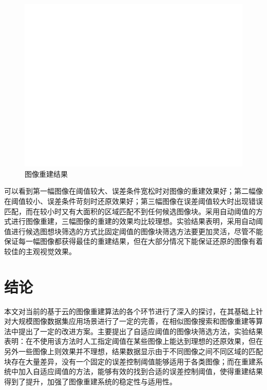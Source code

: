\documentclass[UTF8]{csoarticle}
\begin{document}
\begin{figure}
\centering\includegraphics[width=15cm]{rec_result}
\caption{图像重建结果}
\label{fig:result}
\end{figure}

可以看到第一幅图像在阈值较大、误差条件宽松时对图像的重建效果好；第二幅像在阈值较小、误差条件苛刻时还原效果好；第三幅图像在误差阈值较大时出现错误匹配，而在较小时又有大面积的区域匹配不到任何候选图像块。采用自动阈值的方式进行图像重建，三幅图像的重建的效果均比较理想。实验结果表明，采用自动阈值进行候选图想块筛选的方式比固定阈值的图像块筛选方法要更加灵活，尽管不能保证每一幅图像都获得最佳的重建结果，但在大部分情况下能保证还原的图像有着较佳的主观视觉效果。

\section{结论}

本文对当前的基于云的图像重建算法的各个环节进行了深入的探讨，在其基础上针对大规模图像数据集应用场景进行了一定的完善，在相似图像搜索和图像重建等算法中提出了一定的改进方案。主要提出了自适应阈值的图像块筛选方法，实验结果表明：在不使用该方法时人工指定阈值在某些图像上能达到理想的还原效果，但在另外一些图像上则效果并不理想，结果数据显示由于不同图像之间不同区域的匹配块存在大量差异，没有一个固定的误差控制阈值能够适用于各类图像；而在重建系统中加入自适应阈值的方法，能够有效的找到合适的误差控制阈值，使得重建结果得到了提升，加强了图像重建系统的稳定性与适用性。
\end{document}
